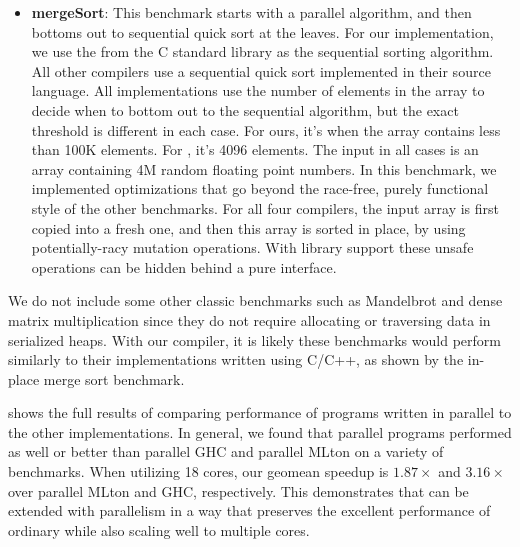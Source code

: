 \begin{itemize}
\item \textbf{mergeSort}:
  This benchmark starts with a parallel algorithm, and then bottoms out to sequential
  quick sort at the leaves.
  For our implementation, we use the  from the C standard library as
  the sequential sorting algorithm.
  All other compilers use a sequential quick sort implemented in their source language.
  All implementations use the number of elements in the array to decide when to
  bottom out to the sequential algorithm, but the exact threshold is different in each case.
  For ours, it's when the array contains less than 100K elements.
  For \MPL{}, it's 4096 elements.
  The input in all cases is an array containing 4M random floating point numbers.
  In this benchmark, we implemented optimizations that go beyond the
  race-free, purely functional style of the other benchmarks.
  For all four compilers, the input array is first copied into a fresh one,
  and then this array is sorted in place, by using potentially-racy mutation operations.
  With library support these unsafe operations can be hidden behind a pure interface.




\end{itemize}

We do not include some other classic benchmarks such as Mandelbrot and dense matrix
multiplication since they do not require allocating or traversing data in
serialized heaps.
%
With our compiler, it is likely these benchmarks would perform similarly to
their implementations written using C/C++, as shown by the in-place merge sort
benchmark.

 shows the full results of comparing performance
of programs written in parallel \ourcalc{} to the other implementations. In
general, we found that parallel \ourcalc{} programs performed as well or better
than parallel GHC and parallel MLton on a variety of benchmarks. When utilizing
18 cores, our geomean speedup is $1.87\times$ and $3.16\times$ over parallel
MLton and GHC, respectively.
%
This demonstrates that \ourcalc{} can be extended with
parallelism in a way that preserves the excellent performance of
ordinary \ourcalc{} while also scaling well to multiple cores.
